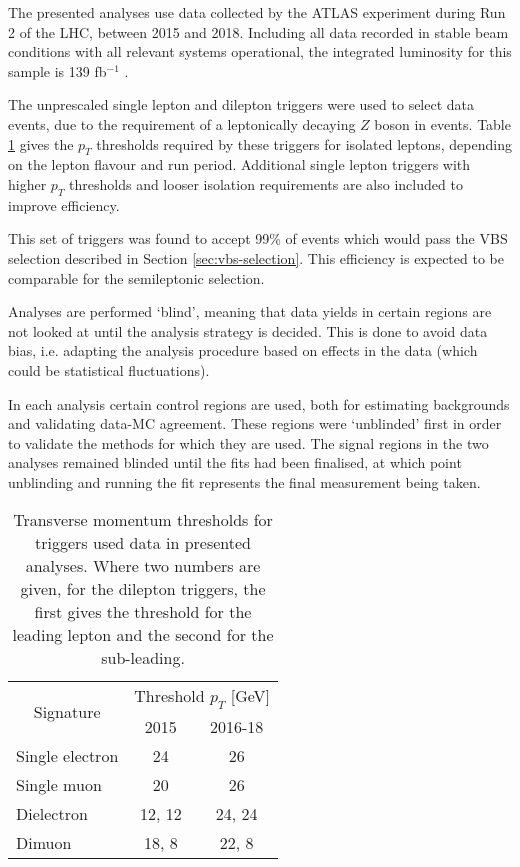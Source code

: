 
The presented analyses use data collected by the \ac{ATLAS} experiment during
Run 2 of the \ac{LHC}, between 2015 and 2018. Including all data recorded in
stable beam conditions with all relevant systems operational, the integrated
luminosity for this sample is 139 fb$^{-1}$ \cite{ATLASdq2020}.

The unprescaled single lepton and dilepton triggers
\cite{ATLAStrigegam2020,ATLAStrigmuon2020}
were used to select data events, due to the requirement of a leptonically
decaying $Z$ boson in events. Table \ref{tab:methods-data-triggers} gives the
$p_T$ thresholds required by these triggers for isolated leptons, depending on
the lepton flavour and run period. Additional single lepton triggers with higher
$p_T$ thresholds and looser isolation requirements are also included to improve
efficiency.

This set of triggers was found to accept 99\% of events which would pass the
\acs{VBS} \Zy selection described in Section \ref{sec:vbs-selection}. This
efficiency is expected to be comparable for the semileptonic \VZy selection.

Analyses are performed `blind', meaning that data yields in certain regions are
not looked at until the analysis strategy is decided. This is done to avoid data
bias, i.e. adapting the analysis procedure based on effects in the data (which
could be statistical fluctuations).

In each analysis certain control regions are used, both for estimating
backgrounds and validating data-\ac{MC} agreement. These regions were `unblinded'
first in order to validate the methods for which they are used. The signal
regions in the two analyses remained blinded until the fits had been finalised,
at which point unblinding and running the fit represents the final measurement
being taken.

\begin{table}[tb]
  \centering
  \renewcommand\arraystretch{1.2}
  \caption{
    Transverse momentum thresholds for triggers used data in presented analyses.
    Where two numbers are given, for the dilepton triggers, the first gives the
    threshold for the leading lepton and the second for the sub-leading.
  }
  \begin{tabular}{lcc}
    \hline\hline
    \multicolumn{1}{c}{\multirow{2}{*}{Signature}} & \multicolumn{2}{c}{Threshold $p_T$ [GeV]} \\
    \cline{2-3}
              & 2015    &   2016-18 \\
    \hline
    Single electron  &  24     &  26     \\   
    Single muon      &  20     &  26     \\   
    Dielectron       &  12, 12  &  24, 24  \\
    Dimuon           &  18, 8   &  22, 8   \\
    \hline\hline
  \end{tabular}
  \label{tab:methods-data-triggers}
\end{table}
